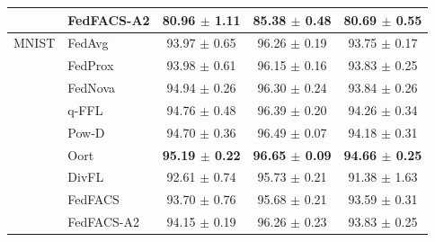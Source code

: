 \begin{table}[!htbp]
\begin{tabular*}{\journalfloatwidth}{@{\extracolsep{\fill}}llccc@{}}
 & FedFACS-A2 & 80.96 $\pm$ 1.11 & 85.38 $\pm$ 0.48 & 80.69 $\pm$ 0.55 \\
\midrule
MNIST & FedAvg & 93.97 $\pm$ 0.65 & 96.26 $\pm$ 0.19 & 93.75 $\pm$ 0.17 \\
 & FedProx & 93.98 $\pm$ 0.61 & 96.15 $\pm$ 0.16 & 93.83 $\pm$ 0.25 \\
 & FedNova & 94.94 $\pm$ 0.26 & 96.30 $\pm$ 0.24 & 93.84 $\pm$ 0.26 \\
 & q-FFL & 94.76 $\pm$ 0.48 & 96.39 $\pm$ 0.20 & 94.26 $\pm$ 0.34 \\
 & Pow-D & 94.70 $\pm$ 0.36 & 96.49 $\pm$ 0.07 & 94.18 $\pm$ 0.31 \\
 & Oort & \textbf{95.19 $\pm$ 0.22} & \textbf{96.65 $\pm$ 0.09} & \textbf{94.66 $\pm$ 0.25} \\
 & DivFL & 92.61 $\pm$ 0.74 & 95.73 $\pm$ 0.21 & 91.38 $\pm$ 1.63 \\
 & FedFACS & 93.70 $\pm$ 0.76 & 95.68 $\pm$ 0.21 & 93.59 $\pm$ 0.31 \\
 & FedFACS-A2 & 94.15 $\pm$ 0.19 & 96.26 $\pm$ 0.23 & 93.83 $\pm$ 0.25 \\
\bottomrule
\end{tabular*}
\end{table}

